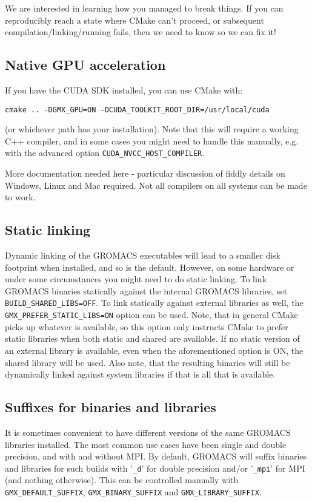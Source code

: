 \documentclass{article}[12pt,a4paper,twoside]
\newcommand{\gromacs}{GROMACS}
\newcommand{\cuda}{CUDA}
\newcommand{\mpi}{MPI}
\newcommand{\cmake}{CMake}
\begin{document}
We are interested in learning how you managed to break things. If you
can reproducibly reach a state where \cmake{} can't proceed, or
subsequent compilation/linking/running fails, then we need to know so
we can fix it!

\subsection{Native GPU acceleration}
If you have the \cuda{} SDK installed, you can use \cmake{}
with:
\begin{verbatim}
cmake .. -DGMX_GPU=ON -DCUDA_TOOLKIT_ROOT_DIR=/usr/local/cuda
\end{verbatim}
(or whichever path has your installation). Note that this will require
a working C++ compiler, and in some cases you might need to handle
this manually, e.g. with the advanced option
\texttt{CUDA\_NVCC\_HOST\_COMPILER}.

More documentation needed here - particular discussion of fiddly
details on Windows, Linux and Mac required. Not all compilers on all
systems can be made to work.

\subsection{Static linking}
Dynamic linking of the \gromacs{} executables will lead to a smaller
disk footprint when installed, and so is the default. However, on some
hardware or under some circumstances you might need to do static
linking. To link \gromacs{} binaries statically against the internal
\gromacs{} libraries, set \texttt{BUILD\_SHARED\_LIBS=OFF}. To link
statically against external libraries as well, the
\texttt{GMX\_PREFER\_STATIC\_LIBS=ON} option can be used. Note, that
in general \cmake{} picks up whatever is available, so this option
only instructs \cmake{} to prefer static libraries when both static
and shared are available. If no static version of an external library
is available, even when the aforementioned option is ON, the shared
library will be used. Also note, that the resulting binaries will
still be dynamically linked against system libraries if that is all
that is available.

\subsection{Suffixes for binaries and libraries}
It is sometimes convenient to have different versions of the same
\gromacs{} libraries installed. The most common use cases have been
single and double precision, and with and without \mpi{}. By default,
\gromacs{} will suffix binaries and libraries for such builds with
'\verb+_d+' for double precision and/or '\verb+_mpi+' for \mpi{} (and
nothing otherwise). This can be controlled manually with
\texttt{GMX\_DEFAULT\_SUFFIX}, \texttt{GMX\_BINARY\_SUFFIX} and
\texttt{GMX\_LIBRARY\_SUFFIX}.
\end{document}
